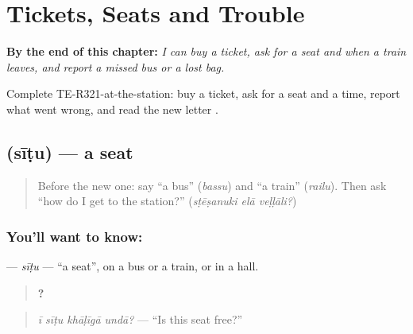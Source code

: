 
\chapter{Tickets, Seats and Trouble}
\label{ch:te-tickets-seats-and-trouble}

\begin{chapteropening}
\textbf{By the end of this chapter:} \emph{I can buy a ticket, ask for a seat and when a train leaves, and report a missed bus or a lost bag.}

Complete TE-R321-at-the-station: buy a ticket, ask for a seat and a time, report what went wrong, and read the new letter .
\end{chapteropening}

\section[\texorpdfstring{\te{సీటు} (sīṭu)}{సీటు (sīṭu)}]{ (sīṭu) — a seat}

\label{lesson:TE-C321-situ}



\begin{quote}
Before the new one: say \textquotedblleft{}a bus\textquotedblright{} (\emph{bassu}) and \textquotedblleft{}a train\textquotedblright{} (\emph{railu}). Then ask \textquotedblleft{}how do I get to the station?\textquotedblright{} (\emph{sṭēṣanuki elā veḷḷāli?})
\end{quote}

\subsection*{You'll want to know: }
\textbf{} — \emph{sīṭu} — \textquotedblleft{}a seat\textquotedblright{}, on a bus or a train, or in a hall.

\begin{quote}
\textbf{   ?}
\end{quote}

\begin{quote}
\emph{ī sīṭu khāḷīgā undā?} — \textquotedblleft{}Is this seat free?\textquotedblright{}
\end{quote}

